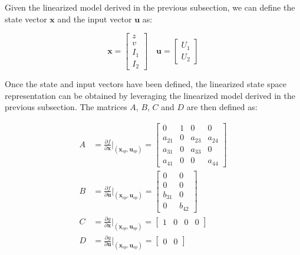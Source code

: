 Given the linearized model derived in the previous subsection, we can define the state vector $\mathbf{x}$ and the input vector $\mathbf{u}$ as:

\begin{equation}
    \mathbf{x} = \begin{bmatrix}
        z   \\
        v   \\
        I_1 \\
        I_2
    \end{bmatrix}
    \quad
    \mathbf{u} = \begin{bmatrix}
        U_1 \\
        U_2
    \end{bmatrix}
\end{equation}

Once the state and input vectors have been defined, the linearized state space representation can be obtained by leveraging the linearized model derived in the previous subsection.
The matrices $A$, $B$, $C$ and $D$ are then defined as:

\begin{equation}
    \begin{aligned}
        A & = \frac{\partial f}{\partial \mathbf{x}} \Bigg|_{(\mathbf{x}_{op}, \mathbf{u}_{op})}
        = \begin{bmatrix}
              0      & 1 & 0      & 0      \\
              a_{21} & 0 & a_{23} & a_{24} \\
              a_{31} & 0 & a_{33} & 0      \\
              a_{41} & 0 & 0      & a_{44}
          \end{bmatrix}                                                           \\
        B & = \frac{\partial f}{\partial \mathbf{u}} \Bigg|_{(\mathbf{x}_{op}, \mathbf{u}_{op})}
        = \begin{bmatrix}
              0      & 0      \\
              0      & 0      \\
              b_{31} & 0      \\
              0      & b_{42}
          \end{bmatrix}                                                                        \\
        C & = \frac{\partial g}{\partial \mathbf{x}} \Bigg|_{(\mathbf{x}_{op}, \mathbf{u}_{op})}
        = \begin{bmatrix}
              1 & 0 & 0 & 0
          \end{bmatrix}                                                                         \\
        D & = \frac{\partial g}{\partial \mathbf{u}} \Bigg|_{(\mathbf{x}_{op}, \mathbf{u}_{op})}
        = \begin{bmatrix}
              0 & 0
          \end{bmatrix}
    \end{aligned}
\end{equation}

